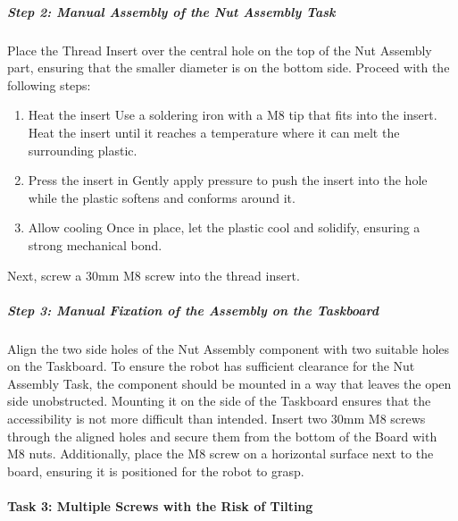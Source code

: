 \documentclass[letterpaper,10pt,english]{sphinxmanual}
\let\sphinxpxdimen\pdfpxdimen\else\newdimen\sphinxpxdimen
\begin{document}
\subparagraph{Step 2: Manual Assembly of the Nut Assembly Task}
\label{\detokenize{4-Assembly-Instructions-Screws-and-Nuts:step-2-manual-assembly-of-the-nut-assembly-task}}
\sphinxAtStartPar
Place the Thread Insert over the central hole on the top of the Nut Assembly part, ensuring that the smaller diameter is on the bottom side.
Proceed with the following steps:
\begin{enumerate}
%
\item {} 
\sphinxAtStartPar
Heat the insert \textendash{} Use a soldering iron with a M8 tip that fits into the insert. Heat the insert until it reaches a temperature where it can melt the surrounding plastic.

\item {} 
\sphinxAtStartPar
Press the insert in \textendash{} Gently apply pressure to push the insert into the hole while the plastic softens and conforms around it.

\item {} 
\sphinxAtStartPar
Allow cooling \textendash{} Once in place, let the plastic cool and solidify, ensuring a strong mechanical bond.

\end{enumerate}

\sphinxAtStartPar
Next, screw a 30mm M8 screw into the thread insert.

\noindent{\hspace*{\fill}\sphinxincludegraphics[width=200\sphinxpxdimen]{{nut_assembly_heat_insert}.png}\hspace*{\fill}}


\subparagraph{Step 3: Manual Fixation of the Assembly on the Taskboard}
\label{\detokenize{4-Assembly-Instructions-Screws-and-Nuts:id2}}
\sphinxAtStartPar
Align the two side holes of the Nut Assembly component with two suitable holes on the Taskboard. To ensure the robot has sufficient clearance for the Nut Assembly Task, the component should be mounted in a way that leaves the open side unobstructed. Mounting it on the side of the Taskboard ensures that the accessibility is not more difficult than intended.
Insert two 30mm M8 screws through the aligned holes and secure them from the bottom of the Board with M8 nuts.
Additionally, place the M8 screw on a horizontal surface next to the board, ensuring it is positioned for the robot to grasp.


\paragraph{Task 3: Multiple Screws with the Risk of Tilting}
\label{\detokenize{4-Assembly-Instructions-Screws-and-Nuts:task-3-multiple-screws-with-the-risk-of-tilting}}
\end{document}
